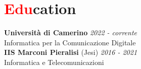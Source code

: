 \section*{\textcolor{red}{Edu}cation}
\large{\textbf{Università di Camerino}}
\hfill\textsl{2022 - corrente}\\[5mm]
Informatica per la Comunicazione Digitale\\[1cm]
\large{\textbf{IIS Marconi Pieralisi} (Jesi)}
\hfill\textsl{2016 - 2021}\\[5mm]
Informatica e Telecomunicazioni